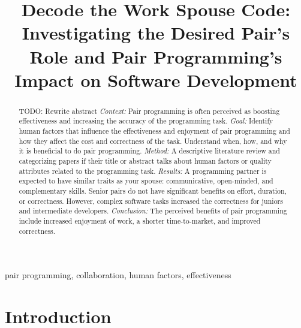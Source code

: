 \documentclass[conference]{IEEEtran}
\newcommand{\todo}[1]{{\color{red} TODO: {#1}}}
\begin{document}
\title{Decode the Work Spouse Code: Investigating the Desired Pair's Role and Pair Programming's Impact on Software Development}


\author{
}

\maketitle

\begin{abstract}
\todo{Rewrite abstract}
\textit{Context:} Pair programming is often perceived as boosting effectiveness and increasing the accuracy of the programming task.
\textit{Goal:} Identify human factors that influence the effectiveness and enjoyment of pair programming and how they affect the cost and correctness of the task. Understand when, how, and why it is beneficial to do pair programming.
\textit{Method:} A descriptive literature review and categorizing papers if their title or abstract talks about human factors or quality attributes related to the programming task.
\textit{Results:} A programming partner is expected to have similar traits as your spouse: communicative, open-minded, and complementary skills. Senior pairs do not have significant benefits on effort, duration, or correctness. However, complex software tasks increased the correctness for juniors and intermediate developers. 
\textit{Conclusion:} The perceived benefits of pair programming include increased enjoyment of work, a shorter time-to-market, and improved correctness.
\end{abstract}

\begin{IEEEkeywords}
pair programming, collaboration, human factors, effectiveness
\end{IEEEkeywords}

\section{Introduction}
\end{document}
